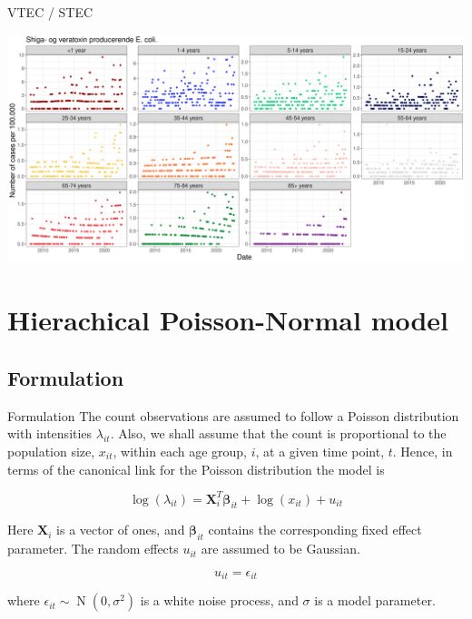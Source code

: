 \documentclass[aspectratio=169]{beamer}
\DeclareMathOperator{\N}{N}
\begin{document}
\begin{frame}{VTEC / STEC}
\tiny

\includegraphics[width=1\linewidth]{../figures/ShigaogveratoxinproducerendeEcolixAgeGroup}

\normalsize
\end{frame}

\hypertarget{hierachical-poisson-normal-model}{%
\section{Hierachical Poisson-Normal
model}\label{hierachical-poisson-normal-model}}

\hypertarget{formulation}{%
\subsection{Formulation}\label{formulation}}

\begin{frame}{Formulation}
The count observations are assumed to follow a Poisson distribution with
intensities \(\lambda_{it}\). Also, we shall assume that the count is
proportional to the population size, \(x_{it}\), within each age group,
\(i\), at a given time point, \(t\). Hence, in terms of the canonical
link for the Poisson distribution the model is

\begin{equation}
  \log(\lambda_{it})=\mathbf{X}_i^T\mathbf{\beta}_{it}+\log(x_{it})+u_{it}
\end{equation}

Here \(\mathbf{X}_i\) is a vector of ones, and \(\mathbf{\beta}_{it}\)
contains the corresponding fixed effect parameter. The random effects
\(u_{it}\) are assumed to be Gaussian.

\begin{equation}
  u_{it} = \epsilon_{it}
\end{equation}

where \(\epsilon_{it}\sim\N(0,\sigma^2)\) is a white noise process, and
\(\sigma\) is a model parameter.
\end{frame}
\end{document}
